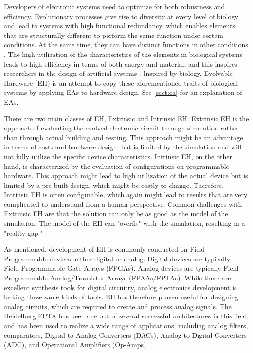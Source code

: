 Developers of electronic systems need to optimize for both robustness and efficiency\cite{mead_neuromorphic_1990}.
Evolutionary processes give rise to diversity at every level of biology and lead to systems with high functional redundancy, which enables elements that are structurally different to perform the same function under certain conditions. At the same time, they can have distinct functions in other conditions \cite{trefzer_evolvable_2015}.
The high utilization of the characteristics of the elements in biological systems leads to high efficiency in terms of both energy and material, and this inspires researchers in the design of artificial systems \cite{mead_neuromorphic_1990}.
Inspired by biology, Evolvable Hardware (EH) is an attempt to copy these aforementioned traits of biological systems by applying EAs to hardware design.
See \vref{sect:ea} for an explanation of EAs.

There are two main classes of EH, Extrinsic and Intrinsic EH.
Extrinsic EH is the approach of evaluating the evolved electronic circuit through simulation rather than through actual building and testing.
This approach might be an advantage in terms of costs and hardware design, but is limited by the simulation and will not fully utilize the specific device characteristics.
Intrinsic EH, on the other hand, is characterized by the evaluation of configurations on programmable hardware.
This approach might lead to high utilization of the actual device but is limited by a pre-built design, which might be costly to change.
Therefore, Intrinsic EH is often configurable, which again might lead to results that are very complicated to understand from a human perspective.
Common challenges with Extrinsic EH are that the solution can only be as good as the model of the simulation. The model of the EH can "overfit" with the simulation, resulting in a "reality gap."
\cite{haddow_challenges_2011}

As mentioned, development of EH is commonly conducted on Field-Programmable devices, either digital or analog.
Digital devices are typically Field-Programmable Gate Arrays (FPGAs).
Analog devices are typically Field-Programmable Analog/Transistor Arrays (FPAAs/FPTAs).
While there are excellent synthesis tools for digital circuitry, analog electronics development is lacking these same kinds of tools.
EH has therefore proven useful for designing analog circuits, which are required to create and process analog signals.
The Heidelberg FPTA has been one out of several successful architectures in this field, and has been used to realize a wide range of applications;
including analog filters, comparators, Digital to Analog Converters (DACs), Analog to Digital Converters (ADC), and Operational Amplifiers (Op-Amps)\cite{trefzer_operational_2005}.
\cite{trefzer_evolvable_2015}

